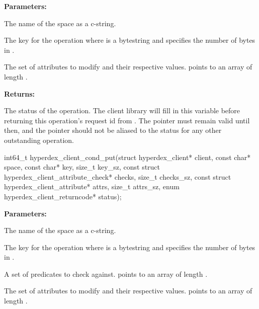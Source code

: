 \noindent\textbf{Parameters:}
\begin{description}[labelindent=\widthof{{\code{attrs}, \code{attrs\_sz}}},leftmargin=*,noitemsep,nolistsep,align=right]
\item[\code{space}] The name of the space as a c-string.
\item[\code{key}, \code{key\_sz}] The key for the operation where  is a bytestring and  specifies the number of bytes in .
\item[\code{attrs}, \code{attrs\_sz}] The set of attributes to modify and their respective values.   points to an array of length .
\end{description}

\noindent\textbf{Returns:}
\begin{description}[labelindent=\widthof{{\code{status}}},leftmargin=*,noitemsep,nolistsep,align=right]
\item[\code{status}] The status of the operation.  The client library will fill in this variable before returning this operation's request id from .  The pointer must remain valid until then, and the pointer should not be aliased to the status for any other outstanding operation.
\end{description}

\funcsep
{}
\begin{ccode}
int64_t hyperdex_client_cond_put(struct hyperdex_client* client,
                const char* space,
                const char* key, size_t key_sz,
                const struct hyperdex_client_attribute_check* checks, size_t checks_sz,
                const struct hyperdex_client_attribute* attrs, size_t attrs_sz,
                enum hyperdex_client_returncode* status);
\end{ccode}
\funcdesc 

\noindent\textbf{Parameters:}
\begin{description}[labelindent=\widthof{{\code{checks}, \code{checks\_sz}}},leftmargin=*,noitemsep,nolistsep,align=right]
\item[\code{space}] The name of the space as a c-string.
\item[\code{key}, \code{key\_sz}] The key for the operation where  is a bytestring and  specifies the number of bytes in .
\item[\code{checks}, \code{checks\_sz}] A set of predicates to check against.   points to an array of length .
\item[\code{attrs}, \code{attrs\_sz}] The set of attributes to modify and their respective values.   points to an array of length .
\end{description}

